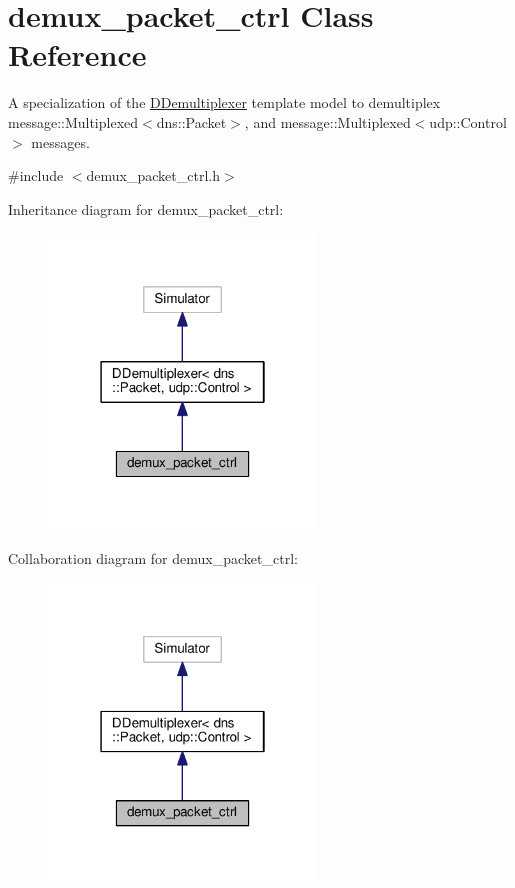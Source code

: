 \hypertarget{classdemux__packet__ctrl}{}\section{demux\+\_\+packet\+\_\+ctrl Class Reference}
\label{classdemux__packet__ctrl}


A specialization of the \hyperlink{classDDemultiplexer}{D\+Demultiplexer} template model to demultiplex message\+::\+Multiplexed$<$dns\+::\+Packet$>$, and message\+::\+Multiplexed$<$udp\+::\+Control$>$ messages.  




{\ttfamily \#include $<$demux\+\_\+packet\+\_\+ctrl.\+h$>$}



Inheritance diagram for demux\+\_\+packet\+\_\+ctrl\+:\nopagebreak
\begin{figure}[H]
\begin{center}
\leavevmode
\includegraphics[width=202pt]{classdemux__packet__ctrl__inherit__graph}
\end{center}
\end{figure}


Collaboration diagram for demux\+\_\+packet\+\_\+ctrl\+:\nopagebreak
\begin{figure}[H]
\begin{center}
\leavevmode
\includegraphics[width=202pt]{classdemux__packet__ctrl__coll__graph}
\end{center}
\end{figure}
